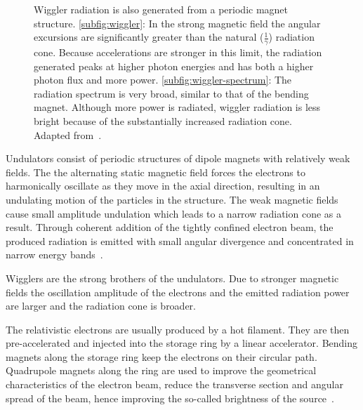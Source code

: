 \begin{figure}
	\noindent{}
	\caption[Wiggler radiation]{Wiggler radiation is also generated from a periodic magnet structure. %
		\ref{subfig:wiggler}: In the strong magnetic field the angular excursions are significantly greater than the natural ($\frac{1}{\gamma}$) radiation cone. Because accelerations are stronger in this limit, the radiation generated peaks at higher photon energies and has both a higher photon flux and more power. %
		\ref{subfig:wiggler-spectrum}: The radiation spectrum is very broad, similar to that of the bending magnet. Although more power is radiated, wiggler radiation is less bright because of the substantially increased radiation cone. Adapted from~\cite{Attwood2007}.}%
	\label{fig:wiggler}
\end{figure}

Undulators consist of periodic structures of dipole magnets with relatively weak fields. The the alternating static magnetic field forces the electrons to harmonically oscillate as they move in the axial direction, resulting in an undulating motion of the particles in the structure. The weak magnetic fields cause small amplitude undulation which leads to a narrow radiation cone as a result. Through coherent addition of the tightly confined electron beam, the produced radiation is emitted with small angular divergence and concentrated in narrow energy bands~\cite{Stampanoni2002a}.

Wigglers are the strong brothers of the undulators. Due to stronger magnetic fields the oscillation amplitude of the electrons and the emitted radiation power are larger and the radiation cone is broader.

The relativistic electrons are usually produced by a hot filament. They are then pre-accelerated and injected into the storage ring by a linear accelerator. Bending magnets along the storage ring keep the electrons on their circular path. Quadrupole magnets along the ring are used to improve the geometrical characteristics of the electron beam, \ie reduce the transverse section and angular spread of the beam, hence improving the so-called brightness of the source~\cite{Margaritondo2002}.

